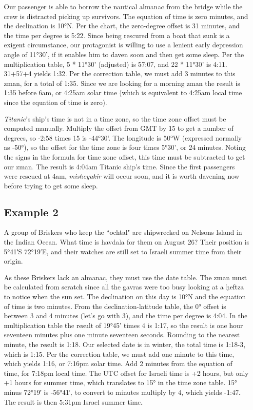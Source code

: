 Our passenger is able to borrow the nautical almanac from the bridge while the crew is distracted picking up survivors. The equation of time is zero minutes, and the declination is 10°N. Per the chart, the zero-degree offset is 31 minutes, and the time per degree is 5:22. Since being rescured from a boat that sunk is a exigent circumstance, our protagonist is willing to use a lenient early depression angle of 11°30’, if it enables him to daven soon and then get some sleep.  Per the multiplication table, 5 * 11°30’ (adjusted) is 57:07, and 22 * 11°30’ is 4:11.  31+57+4 yields 1:32. Per the correction table, we must add 3 minutes to this zman, for a total of 1:35.  Since we are looking for a morning zman the result is 1:35 before 6am, or 4:25am solar time (which is equivalent to 4:25am local time since the equation of time is zero).

\textit{Titanic}'s ship's time is not in a time zone, so the time zone offset must be computed manually. Multiply the offset from GMT by 15 to get a number of degrees, so -2:58 times 15 is -44°30'.  The longitude is 50°W (expressed normally as -50°), so the offset for the time zone is four times 5°30', or 24 minutes. Noting the signs in the formula for time zone offset, this time must be subtracted to get our zman.  The result is 4:04am Titanic ship's time.  Since the first passengers were rescued at 4am, \textit{misheyakir} will occur soon, and it is worth davening now before trying to get some sleep.

\subsection{Example 2}

A group of Briskers who keep the ``ochtal" are shipwrecked on Nelsons Island in the Indian Ocean. What time is havdala for them on August 26?  Their position is 5°41′S 72°19′E, and their watches are still set to Israeli summer time from their origin.

As these Briskers lack an almanac, they must use the date table. The zman must be calculated from scratch since all the gavras were too busy looking at a \d{h}eftza to notice when the sun set. The declination on this day is 10°N and the equation of time is two minutes.  From the declination-latitude table, the 0° offset is between 3 and 4 minutes (let's go with 3), and the time per degree is 4:04. In the multiplication table the result of 19°45’ times 4 is 1:17, so the result is one hour seventeen minutes plus one minute seventeen seconds. Rounding to the nearest minute, the result is 1:18. Our selected date is in winter, the total time is 1:18-3, which is 1:15.  Per the correction table, we must add one minute to this time, which yields 1:16, or 7:16pm solar time.  Add 2 minutes from the equation of time, for 7:18pm local time. The UTC offset for Israeli time is +2 hours, but only +1 hours for summer time, which translates to 15° in the time zone table.  15° minus 72°19′ is -56°41′, to convert to minutes multiply by 4, which yields -1:47.  The result is then 5:31pm Israel summer time.

